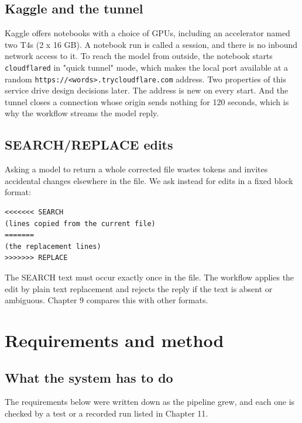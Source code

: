 \documentclass[11pt,a4paper]{report}
\begin{document}
\section{Kaggle and the tunnel}

Kaggle offers notebooks with a choice of GPUs, including an accelerator named two T4s (2 x 16 GB). A notebook run is called a session, and there is no inbound network access to it. To reach the model from outside, the notebook starts \texttt{cloudflared} in "quick tunnel" mode, which makes the local port available at a random \texttt{https:/\allowbreak{}/\allowbreak{}\textless{}words\textgreater{}.\allowbreak{}trycloudflare.\allowbreak{}com} address. Two properties of this service drive design decisions later. The address is new on every start. And the tunnel closes a connection whose origin sends nothing for 120 seconds, which is why the workflow streams the model reply.

\section{SEARCH/REPLACE edits}

Asking a model to return a whole corrected file wastes tokens and invites accidental changes elsewhere in the file. We ask instead for edits in a fixed block format:

\begin{lstlisting}
<<<<<<< SEARCH
(lines copied from the current file)
=======
(the replacement lines)
>>>>>>> REPLACE
\end{lstlisting}

The SEARCH text must occur exactly once in the file. The workflow applies the edit by plain text replacement and rejects the reply if the text is absent or ambiguous. Chapter 9 compares this with other formats.

\chapter{Requirements and method}

\section{What the system has to do}

The requirements below were written down as the pipeline grew, and each one is checked by a test or a recorded run listed in Chapter 11.
\end{document}
